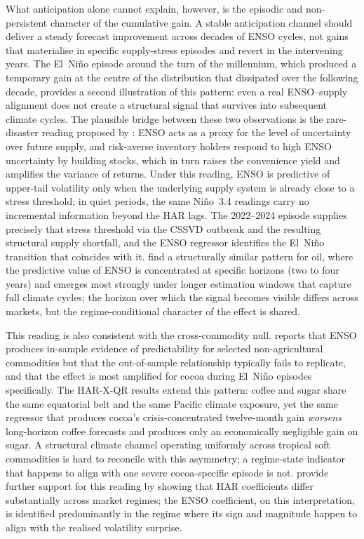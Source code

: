 What anticipation alone cannot explain, however, is the episodic and
non-persistent character of the cumulative gain. A stable anticipation
channel should deliver a steady forecast improvement across decades of ENSO
cycles, not gains that materialise in specific supply-stress episodes and
revert in the intervening years. The El~Ni\~no episode around the turn of
the millennium, which produced a temporary gain at the centre of the
distribution that dissipated over the following decade, provides a second
illustration of this pattern: even a
real ENSO--supply alignment does not create a structural signal that
survives into subsequent climate cycles. The
plausible bridge between these two observations is the rare-disaster reading
proposed by \textcite{bonatoNinoNinaForecastability2023}: ENSO acts as a
proxy for the level of uncertainty over future supply, and risk-averse
inventory holders respond to high ENSO uncertainty by building stocks, which
in turn raises the convenience yield and amplifies the variance of returns.
Under this reading, ENSO is predictive of upper-tail volatility only when
the underlying supply system is already close to a stress threshold; in
quiet periods, the same Ni\~no~3.4 readings carry no incremental information
beyond the HAR lags. The 2022--2024 episode supplies precisely that stress
threshold via the CSSVD outbreak and the resulting structural supply
shortfall, and the ENSO regressor identifies the El~Ni\~no transition that
coincides with it. \textcite{bouriNinoForecastabilityOilprice2021} find a
structurally similar pattern for oil, where the predictive value of ENSO is
concentrated at specific horizons (two to four years) and emerges most
strongly under longer estimation windows that capture full climate cycles;
the horizon over which the signal becomes visible differs across markets,
but the regime-conditional character of the effect is shared.

This reading is also consistent with the cross-commodity null.
\textcite{ubilavaRoleNinoSouthern2018} reports that ENSO produces in-sample
evidence of predictability for selected non-agricultural commodities but
that the out-of-sample relationship typically fails to replicate, and that
the effect is most amplified for cocoa during El~Ni\~no episodes
specifically. The HAR-X-QR results extend this pattern: coffee and sugar
share the same equatorial belt and the same Pacific climate exposure, yet
the same regressor that produces cocoa's crisis-concentrated twelve-month
gain \emph{worsens} long-horizon coffee forecasts and produces only an
economically negligible gain on sugar. A structural climate
channel operating uniformly across tropical soft commodities is hard to
reconcile with this asymmetry; a regime-state indicator that happens to
align with one severe cocoa-specific episode is not.
\textcite{huangHighfrequencyApproachVaR2022} provide further support for
this reading by showing that HAR coefficients differ substantially across
market regimes; the ENSO coefficient, on this interpretation, is identified
predominantly in the regime where its sign and magnitude happen to align
with the realised volatility surprise.

